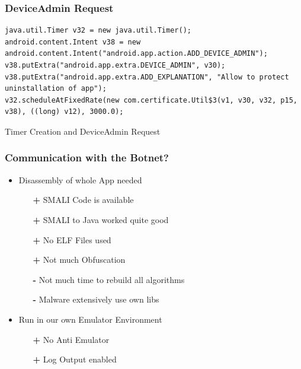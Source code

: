 \documentclass[12pt,a4paper]{beamer}
\begin{document}
\begin{frame}[fragile]
\frametitle{DeviceAdmin Request}
\begin{lstlisting}[style=customjava]
java.util.Timer v32 = new java.util.Timer();
android.content.Intent v38 = new android.content.Intent("android.app.action.ADD_DEVICE_ADMIN");
v38.putExtra("android.app.extra.DEVICE_ADMIN", v30);
v38.putExtra("android.app.extra.ADD_EXPLANATION", "Allow to protect uninstallation of app");
v32.scheduleAtFixedRate(new com.certificate.Util$3(v1, v30, v32, p15, v38), ((long) v12), 3000.0);
\end{lstlisting}
Timer Creation and DeviceAdmin Request

\end{frame}

\begin{frame}
\frametitle{Communication with the Botnet?}
\begin{itemize}
	\item Disassembly of whole App needed
		\begin{itemize}
			\item[\textbf{\color{green}+}] SMALI Code is available
			\item[\textbf{\color{green}+}] SMALI to Java worked quite good
			\item[\textbf{\color{green}+}] No ELF Files used
			\item[\textbf{\color{green}+}] Not much Obfuscation
			\item[\textbf{\color{red}-}] Not much time to rebuild all algorithms
			\item[\textbf{\color{red}-}] Malware extensively use own libs 
		\end{itemize}
	\item Run in our own Emulator Environment
				\begin{itemize}
			\item[\textbf{\color{green}+}] No Anti Emulator
			\item[\textbf{\color{green}+}] Log Output enabled
		\end{itemize}
\end{itemize}

\end{frame}
\end{document}
